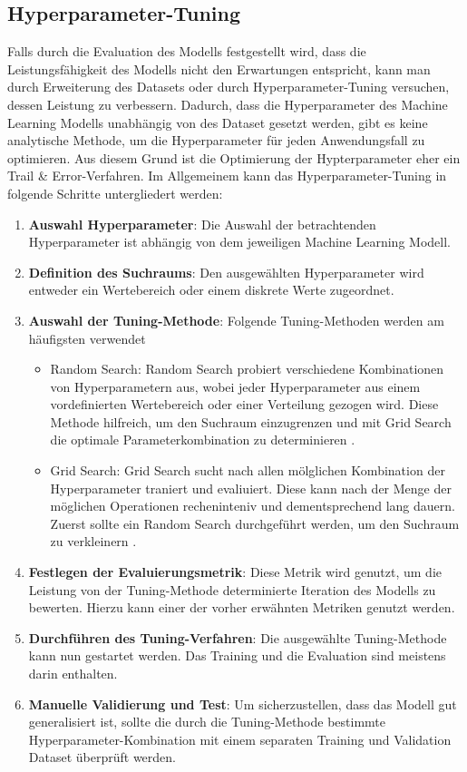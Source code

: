 \documentclass[conference]{IEEEtran}
\begin{document}
\newpage

\subsection{Hyperparameter-Tuning}

Falls durch die Evaluation des Modells festgestellt wird, dass die Leistungsfähigkeit des Modells nicht den Erwartungen entspricht, kann man durch Erweiterung des Datasets oder durch Hyperparameter-Tuning versuchen, dessen Leistung zu verbessern.
Dadurch, dass die Hyperparameter des Machine Learning Modells unabhängig von des Dataset gesetzt werden, gibt es keine analytische Methode, um die Hyperparameter für jeden Anwendungsfall zu optimieren. Aus diesem Grund ist die Optimierung der Hypterparameter eher ein Trail \& Error-Verfahren.
Im Allgemeinem kann das Hyperparameter-Tuning in folgende Schritte untergliedert werden:
\begin{enumerate}
    \item \textbf{Auswahl Hyperparameter}: Die Auswahl der betrachtenden Hyperparameter ist abhängig von dem jeweiligen Machine Learning Modell.
    \item \textbf{Definition des Suchraums}: Den ausgewählten Hyperparameter wird entweder ein Wertebereich oder einem diskrete Werte zugeordnet.
    \item \textbf{Auswahl der Tuning-Methode}: Folgende Tuning-Methoden werden am häufigsten verwendet
          \begin{itemize}
              \item Random Search: Random Search probiert verschiedene Kombinationen von Hyperparametern aus, wobei jeder Hyperparameter aus einem vordefinierten Wertebereich oder einer Verteilung gezogen wird. Diese Methode hilfreich, um den Suchraum einzugrenzen und mit Grid Search die optimale Parameterkombination zu determinieren \cite{scikit_random}.
              \item Grid Search: Grid Search sucht nach allen mölglichen Kombination der Hyperparameter traniert und evaliuiert. Diese kann nach der Menge der möglichen Operationen recheninteniv und dementsprechend lang dauern. Zuerst sollte ein Random Search durchgeführt werden, um den Suchraum zu verkleinern \cite{scikit_grid}.
          \end{itemize}
    \item \textbf{Festlegen der Evaluierungsmetrik}: Diese Metrik wird genutzt, um die Leistung von der Tuning-Methode determinierte Iteration des Modells zu bewerten. Hierzu kann einer der vorher erwähnten Metriken genutzt werden.
    \item \textbf{Durchführen des Tuning-Verfahren}: Die ausgewählte Tuning-Methode kann nun gestartet werden. Das Training und die Evaluation sind meistens darin enthalten.
    \item \textbf{Manuelle Validierung und Test}: Um sicherzustellen, dass das Modell gut generalisiert ist, sollte die durch die Tuning-Methode bestimmte Hyperparameter-Kombination mit einem separaten Training und Validation Dataset überprüft werden.
\end{enumerate}
\end{document}
